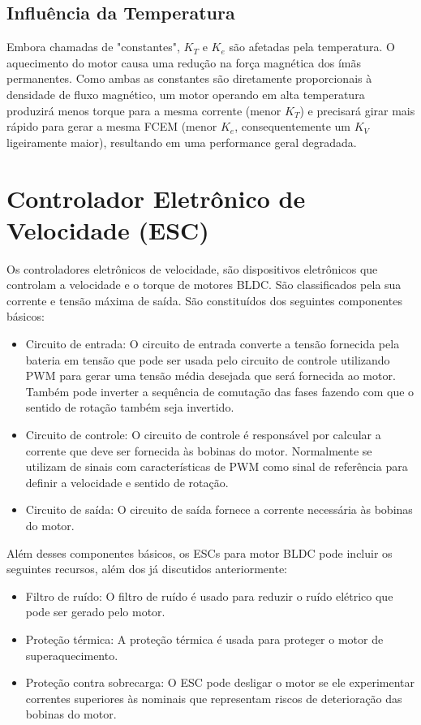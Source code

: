 \subsection{Influência da Temperatura}

Embora chamadas de "constantes", $K_T$ e $K_e$ são afetadas pela temperatura. O aquecimento do motor causa uma redução na força magnética dos ímãs permanentes. Como ambas as constantes são diretamente proporcionais à densidade de fluxo magnético, um motor operando em alta temperatura produzirá menos torque para a mesma corrente (menor $K_T$) e precisará girar mais rápido para gerar a mesma FCEM (menor $K_e$, consequentemente um $K_V$ ligeiramente maior), resultando em uma performance geral degradada.

\section{Controlador Eletrônico de Velocidade (ESC)} 
 Os controladores eletrônicos de velocidade, são dispositivos eletrônicos que controlam a velocidade e o torque de motores BLDC. São classificados pela sua corrente e tensão máxima de saída. São constituídos dos seguintes componentes básicos: 

 \begin{itemize} 
 \item Circuito de entrada: O circuito de entrada converte a tensão fornecida pela bateria em tensão que pode ser usada pelo circuito de controle utilizando PWM para gerar uma tensão média desejada que será fornecida ao motor. Também pode inverter a sequência de comutação das fases fazendo com que o sentido de rotação também seja invertido. 
 \item Circuito de controle: O circuito de controle é responsável por calcular a corrente que deve ser fornecida às bobinas do motor. Normalmente se utilizam de sinais com características de PWM como sinal de referência para definir a velocidade e sentido de rotação. 
 \item Circuito de saída: O circuito de saída fornece a corrente necessária às bobinas do motor. 
 \end{itemize} 

 Além desses componentes básicos, os ESCs para motor BLDC pode incluir os seguintes recursos, além dos já discutidos anteriormente: 

 \begin{itemize} 
 \item Filtro de ruído: O filtro de ruído é usado para reduzir o ruído elétrico que pode ser gerado pelo motor. 
 \item Proteção térmica: A proteção térmica é usada para proteger o motor de superaquecimento. 
 \item Proteção contra sobrecarga: O ESC pode desligar o motor se ele experimentar correntes superiores às nominais que representam riscos de deterioração das bobinas do motor. 
 \end{itemize} 

